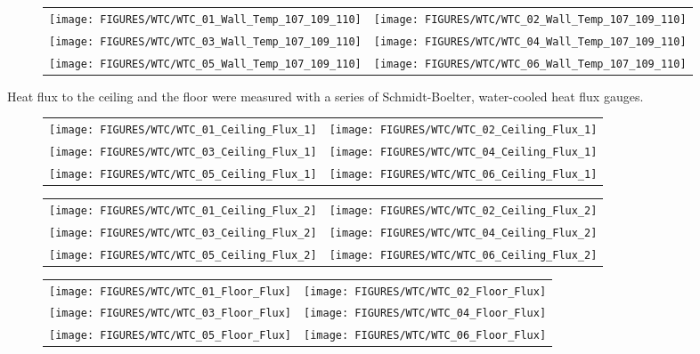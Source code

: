 \begin{figure}[p]
\begin{tabular*}{\textwidth}{l@{\extracolsep{\fill}}r}
\texttt{[image: FIGURES/WTC/WTC\_01\_Wall\_Temp\_107\_109\_110]} &
\texttt{[image: FIGURES/WTC/WTC\_02\_Wall\_Temp\_107\_109\_110]} \\
\texttt{[image: FIGURES/WTC/WTC\_03\_Wall\_Temp\_107\_109\_110]} &
\texttt{[image: FIGURES/WTC/WTC\_04\_Wall\_Temp\_107\_109\_110]} \\
\texttt{[image: FIGURES/WTC/WTC\_05\_Wall\_Temp\_107\_109\_110]} &
\texttt{[image: FIGURES/WTC/WTC\_06\_Wall\_Temp\_107\_109\_110]}
\end{tabular*}
\label{NIST_WTC_Wall_107_109_110}
\end{figure}

\clearpage

Heat flux to the ceiling and the floor were measured with a series of Schmidt-Boelter, water-cooled heat flux gauges.
\begin{figure}[h!]
\begin{tabular*}{\textwidth}{l@{\extracolsep{\fill}}r}
\texttt{[image: FIGURES/WTC/WTC\_01\_Ceiling\_Flux\_1]} &
\texttt{[image: FIGURES/WTC/WTC\_02\_Ceiling\_Flux\_1]} \\
\texttt{[image: FIGURES/WTC/WTC\_03\_Ceiling\_Flux\_1]} &
\texttt{[image: FIGURES/WTC/WTC\_04\_Ceiling\_Flux\_1]} \\
\texttt{[image: FIGURES/WTC/WTC\_05\_Ceiling\_Flux\_1]} &
\texttt{[image: FIGURES/WTC/WTC\_06\_Ceiling\_Flux\_1]}
\end{tabular*}
\end{figure}

\begin{figure}[p]
\begin{tabular*}{\textwidth}{l@{\extracolsep{\fill}}r}
\texttt{[image: FIGURES/WTC/WTC\_01\_Ceiling\_Flux\_2]} &
\texttt{[image: FIGURES/WTC/WTC\_02\_Ceiling\_Flux\_2]} \\
\texttt{[image: FIGURES/WTC/WTC\_03\_Ceiling\_Flux\_2]} &
\texttt{[image: FIGURES/WTC/WTC\_04\_Ceiling\_Flux\_2]} \\
\texttt{[image: FIGURES/WTC/WTC\_05\_Ceiling\_Flux\_2]} &
\texttt{[image: FIGURES/WTC/WTC\_06\_Ceiling\_Flux\_2]}
\end{tabular*}
\end{figure}

\begin{figure}[p]
\begin{tabular*}{\textwidth}{l@{\extracolsep{\fill}}r}
\texttt{[image: FIGURES/WTC/WTC\_01\_Floor\_Flux]} &
\texttt{[image: FIGURES/WTC/WTC\_02\_Floor\_Flux]} \\
\texttt{[image: FIGURES/WTC/WTC\_03\_Floor\_Flux]} &
\texttt{[image: FIGURES/WTC/WTC\_04\_Floor\_Flux]} \\
\texttt{[image: FIGURES/WTC/WTC\_05\_Floor\_Flux]} &
\texttt{[image: FIGURES/WTC/WTC\_06\_Floor\_Flux]}
\end{tabular*}
\end{figure}

